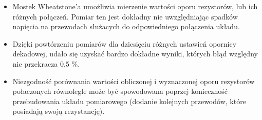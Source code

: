\documentclass [a4paper,11pt]{article}
\begin{document}
\begin{itemize}
	\item Mostek Wheatstone'a umożliwia mierzenie wartości oporu rezystorów, lub ich różnych połączeń. Pomiar ten jest dokładny nie uwzględniając spadków napięcia na przewodach służacych do odpowiedniego połączenia układu.
	\item Dzięki powtórzeniu pomiarów dla dziesięciu różnych ustawień opornicy dekadowej, udało się uzyskać bardzo dokładne wyniki, których błąd względny nie przekracza 0,5 \%. 
	\item Niezgodność porównania wartości obliczonej i wyznaczonej oporu rezystorów połaczonych równolegle może być spowodowana poprzej konieczność przebudowania układu pomiarowego (dodanie kolejnych przewodów, które posiadają swoją rezystancję).
\end{itemize}
\end{document}
